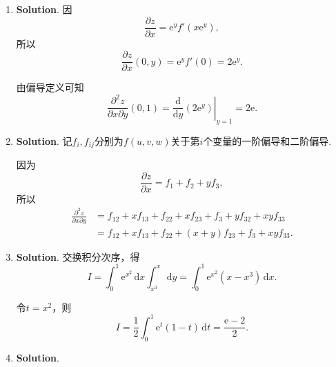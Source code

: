 \documentclass[../Main.tex]{subfiles}
\begin{document}
\begin{enumerate}
          所以切线方程为
          \[
              \frac{x-1}{1}=\frac{y-1}{-1}=\frac{z-1}{0},
          \]
          法平面方程为
          \[
              x-y=0.
          \]

    \item \textbf{Solution}. 因
          \[
              \frac{\partial z}{\partial x}=\mathrm{e}^{y}f'(x\mathrm{e}^{y}),
          \]
          所以
          \[
              \frac{\partial z}{\partial x}(0,y)=\mathrm{e}^{y}f'(0)=2\mathrm{e}^{y}.
          \]

          由偏导定义可知
          \[
              \frac{\partial^{2}z}{\partial x\partial y}(0,1)
              =\left.\frac{\mathrm{d}}{\mathrm{d}y}\left(2\mathrm{e}^{y}\right)\right|_{y=1}=2\mathrm{e}.
          \]

    \item \textbf{Solution}. 记$f_{i},f_{ij}$分别为$f(u,v,w)$关于第$i$个变量的一阶偏导和二阶偏导.

          因为
          \[
              \frac{\partial z}{\partial x}=f_{1}+f_{2}+yf_{3},
          \]
          所以
          \[
              \begin{aligned}
                  \frac{\partial^{2}z}{\partial x\partial y}
                   & =f_{12}+xf_{13}+f_{22}+xf_{23}+f_{3}+yf_{32}+xyf_{33} \\
                   & =f_{12}+xf_{13}+f_{22}+(x+y)f_{23}+f_{3}+xyf_{33}.
              \end{aligned}
          \]

    \item \textbf{Solution}. 交换积分次序，得
          \[
              I=\int_{0}^{1}\mathrm{e}^{x^{2}}\,\mathrm{d}x\int_{x^{3}}^{x}\,\mathrm{d}y
              =\int_{0}^{1}\mathrm{e}^{x^{2}}(x-x^{3})\,\mathrm{d}x.
          \]

          令$t=x^{2}$，则
          \[
              I=\frac{1}{2}\int_{0}^{1}\mathrm{e}^{t}(1-t)\,\mathrm{d}t=\frac{\mathrm{e}-2}{2}.
          \]

    \item \textbf{Solution}.


\end{enumerate}
\end{document}
